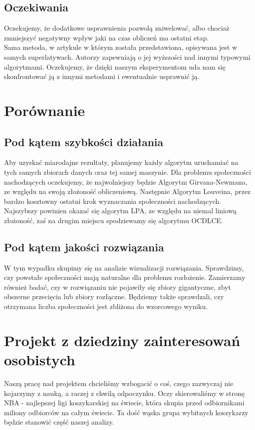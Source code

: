 \documentclass{article}
\begin{document}
\subsection{Oczekiwania}
Oczekujemy, że dodatkowe usprawnienia pozwolą zniwelować, albo chociaż zmniejszyć negatywny wpływ jaki na czas obliczeń ma ostatni etap. \\
Sama metoda, w artykule w którym została przedstawiona, opisywana jest w samych superlatywach. Autorzy zapewniają o jej wyższości nad innymi typowymi algorytmami. Oczekujemy, że dzięki naszym eksperymentom uda nam się skonfrontować ją z innymi metodami i ewentualnie usprawnić ją.

\newpage
\section{Porównanie}
\subsection{Pod kątem szybkości działania}
Aby uzyskać miarodajne rezultaty, planujemy każdy algorytm uruchamiać na tych samych zbiorach danych oraz tej samej maszynie. Dla problemu społeczności nachodzących oczekujemy, że najwolniejszy będzie Algorytm Girvana-Newmana, ze względu na swoją złożoność obliczeniową. Następnie Algorytm Louveina, przez bardzo kosztowny ostatni krok wyznaczania społeczności nachodzących. Najszybszy powinien okazać się algorytm LPA, ze względu na niemal liniową złożoność, zaś na drugim miejscu spodziewamy się algorytmu OCDLCE.

\subsection{Pod kątem jakości rozwiązania}
W tym wypadku skupimy się na analizie wizualizacji rozwiązania. Sprawdzimy, czy powstałe społeczności mają naturalne dla problemu rozłożenie. Zamierzamy również badać, czy w rozwiązaniu nie pojawiły się zbiory gigantyczne, zbyt obszerne przecięcia  lub zbiory rozłączne. Będziemy także sprawdzali, czy otrzymana liczba społeczności jest zbliżona do wzorcowego wyniku.

\newpage
\section{Projekt z dziedziny zainteresowań osobistych}
Naszą pracę nad projektem chcieliśmy wzbogacić o coś, czego zazwyczaj nie kojarzymy z nauką, a raczej z chwilą odpoczynku. Oczy skierowaliśmy w stronę NBA - najlepszej ligi koszykarskiej na świecie, która skupia przed odbiornikami miliony odbiorców na całym świecie. Ta dość wąska grupa wybitnych koszykarzy będzie stanowić część naszej analizy.
\end{document}
